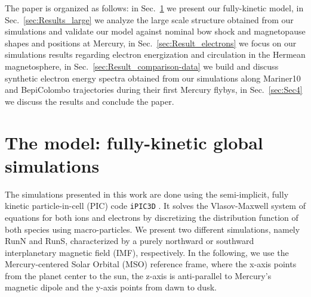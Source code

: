 \documentclass{aa}
\begin{document}

The paper is organized as follows: 
in Sec.~\ref{sec:Model} we present our fully-kinetic model, in Sec.~\ref{sec:Results_large} we analyze the large scale structure obtained from our simulations and validate our model against nominal bow shock and magnetopause shapes and positions at Mercury,
in Sec.~\ref{sec:Result_electrons} we focus on our simulations results regarding electron energization and circulation in the Hermean magnetosphere,
in Sec.~\ref{sec:Result_comparison-data} we build and discuss synthetic electron energy spectra obtained from our simulations along Mariner10 and BepiColombo trajectories during their first Mercury flybys,
in Sec.~\ref{sec:Sec4} we discuss the results and conclude the paper.


\section{The model: fully-kinetic global simulations}\label{sec:Model}
The simulations presented in this work are done using the semi-implicit, fully kinetic particle-in-cell (PIC) code \texttt{iPIC3D} \citep{Markidis2010}. It solves the Vlasov-Maxwell system of equations for both ions and electrons by discretizing the distribution function of both species using macro-particles. We present two different simulations, namely RunN and RunS, characterized by a purely northward or southward interplanetary magnetic field (IMF), respectively. In the following, we use the Mercury-centered Solar Orbital (MSO) reference frame, where the x-axis points from the planet center to the sun, the z-axis is anti-parallel to Mercury's magnetic dipole and the y-axis points from dawn to dusk. 
\end{document}
